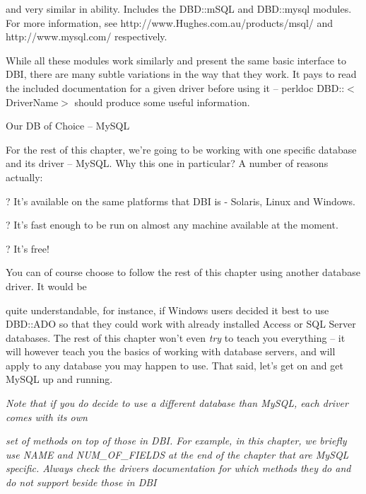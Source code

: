 \documentclass[a4paper,11pt]{book}
\begin{document}
\noindent and very similar  in ability.  Includes  the  DBD::mSQL and  DBD::mysql modules.  For more information,  see http://www.Hughes.com.au/products/msql/ and http://www.mysql.com/ respectively.

\noindent 

\noindent While all these modules work similarly and present the same basic interface to DBI, there are many subtle variations in the way that they work. It pays to read the included documentation for a given driver before using it -- perldoc DBD::$<$DriverName$>$ should produce some useful information.

\noindent 

\noindent Our DB of Choice -- MySQL

\noindent 

\noindent For the rest of this chapter, we're going to be working with one specific database and its driver -- MySQL. Why this one in particular? A number of reasons actually:

\noindent 

\noindent ? It's available on the same platforms that DBI is - Solaris, Linux and Windows.

\noindent 

\noindent ? It's fast enough to be run on almost any machine available at the moment.

\noindent 

\noindent ? It's free!

\noindent 

\noindent 

\noindent You can of course choose to follow the rest of this chapter using another database driver. It would be

\noindent quite understandable, for instance, if Windows users decided it best to use DBD::ADO so that they could work with already installed Access or SQL Server databases. The rest of this chapter won't even \textit{try }to teach you everything -- it will however teach you the basics of working with database servers, and will apply to any database you may happen to use. That said, let's get on and get MySQL up and running.

\noindent 

\noindent \textit{Note that if you do decide to use a different database than MySQL, each driver comes with its own}

\noindent \textit{set of methods on top of those in DBI. For example, in this chapter, we briefly use NAME and NUM\_OF\_FIELDS at the end of the chapter that are MySQL specific. Always check the drivers documentation for which methods they do and do not support beside those in DBI}
\end{document}
